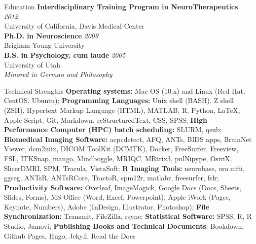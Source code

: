 \documentclass{resume} %
\begin{document}

\begin{rSection}{Education}
	{\bf Interdisciplinary Training Program in NeuroTherapeutics} \hfill {\em 2012}\\
	University of California, Davis Medical Center\\
	{\bf Ph.D. in Neuroscience} \hfill {\em 2009}\\
	Brigham Young University\\
	{\bf B.S. in Psychology, cum laude} \hfill {\em 2005}\\ 
	University of Utah\\ 
	\em{Minored in German and Philosophy}
\end{rSection}

\begin{rSection}{Technical Strengths}
	\textbf{Operating systems:} Mac OS (10.x) and Linux (Red Hat, CentOS, Ubuntu); 
	\textbf{Programming Languages:} Unix shell (BASH), Z shell (ZSH), Hypertext Markup Language (HTML), MATLAB, R, Python, LaTeX, Apple Script, Git, Markdown, reStructuredText, CSS, SPSS;
	\textbf{High Performance Computer (HPC) batch scheduling:} SLURM, qsub;
	\textbf{Biomedical Imaging Software:} acpcdetect, AFQ, ANTs, BIDS apps, BrainNet Viewer, dcm2niix, DICOM ToolKit (DCMTK), Docker, FreeSurfer, Freeview, FSL, ITKSnap, mango, Mindboggle, MRIQC, MRtrix3, pnlNipype, OsiriX, SlicerDMRI, SPM, Tracula, VistaSoft;
	\textbf{R Imaging Tools:} neurobase, oro.nifti, ggseg, ANTsR, ANTsRCore, TractoR, spm12r, matlabr, freesurfer, fslr;
	\textbf{Productivity Software:} Overleaf, ImageMagick, Google Docs (Docs, Sheets, Slides, Forms), MS Office (Word, Excel, Powerpoint), Apple iWork (Pages, Keynote, Numbers), Adobe (InDesign, Illustrator, Photoshop);
	\textbf{File Synchronization:} Transmit, FileZilla, rsync;
	\textbf{Statistical Software:} SPSS, R, R Studio, Jamovi;
	\textbf{Publishing Books and Technical Documents}: Bookdown, Github Pages, Hugo, Jekyll, Read the Docs
\end{rSection}
\end{document}
